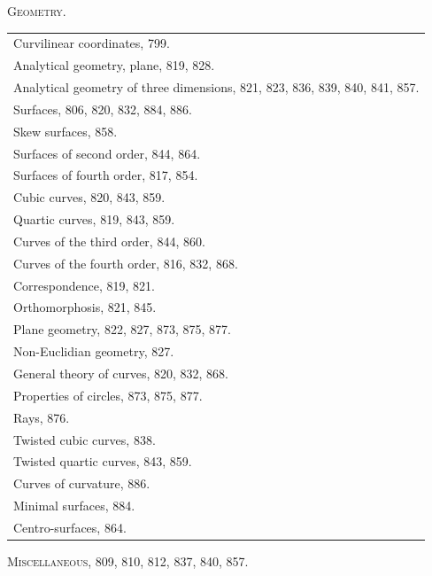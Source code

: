 \documentclass[11pt,a4paper]{book}
\begin{document}
\begin{center}
\textsc{Geometry.}
\end{center}
\begin{center}
\begin{tabular}{p{12cm}}
Curvilinear coordinates, 799.\\
Analytical geometry, plane, 819, 828.\\
Analytical geometry of three dimensions, 821, 823, 836, 839, 840, 841, 857.\\
Surfaces, 806, 820, 832, 884, 886.\\
Skew surfaces, 858.\\
Surfaces of second order, 844, 864.\\
Surfaces of fourth order, 817, 854.\\
Cubic curves, 820, 843, 859.\\
Quartic curves, 819, 843, 859.\\
Curves of the third order, 844, 860.\\
Curves of the fourth order, 816, 832, 868.\\
Correspondence, 819, 821.\\
Orthomorphosis, 821, 845.\\
Plane geometry, 822, 827, 873, 875, 877.\\
Non-Euclidian geometry, 827.\\
General theory of curves, 820, 832, 868.\\
Properties of circles, 873, 875, 877.\\
Rays, 876.\\
Twisted cubic curves, 838.\\
Twisted quartic curves, 843, 859.\\
Curves of curvature, 886.\\
Minimal surfaces, 884.\\
Centro-surfaces, 864.\\
\end{tabular}
\end{center}

\begin{center}
\textsc{Miscellaneous,} 809, 810, 812, 837, 840, 857.
\end{center}
\cleardoublepage

\setcounter{page}{1}

\end{document}

